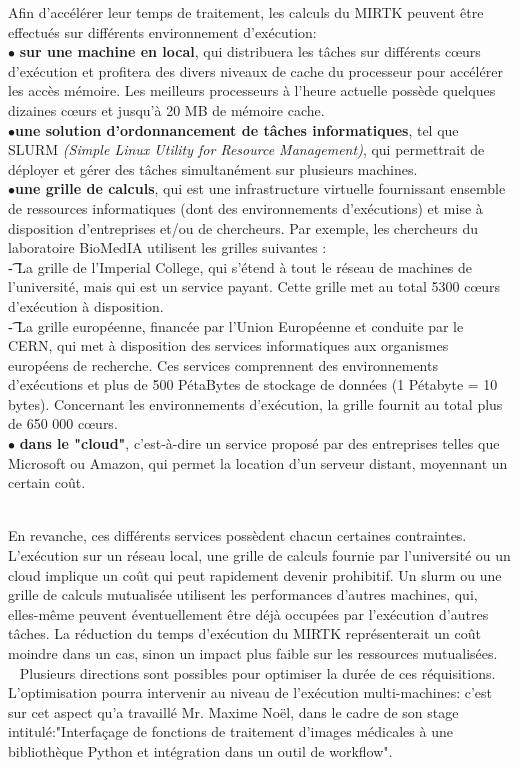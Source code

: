 \documentclass[10pt]{report}
\begin{document}
	Afin d'accélérer leur temps de traitement, les calculs du MIRTK peuvent être effectués sur différents environnement d'exécution:
	\\{$\bullet$}\textbf{ sur une machine en local}, 
	qui distribuera les tâches sur différents cœurs d'exécution et profitera des divers niveaux de cache du processeur pour accélérer les accès mémoire. Les meilleurs processeurs à l'heure actuelle possède quelques dizaines cœurs et jusqu'à 20 MB de mémoire cache.
	\\{$\bullet$}\textbf{une solution d'ordonnancement de tâches informatiques}, tel que SLURM \textit{(Simple Linux Utility for Resource Management)}, qui permettrait de déployer et gérer des tâches simultanément sur plusieurs machines. 
	\\{$\bullet$}\textbf{une grille de calculs}, qui est une infrastructure virtuelle fournissant ensemble de ressources informatiques (dont des environnements d'exécutions) et mise à disposition d'entreprises et/ou de chercheurs. \newline
	Par exemple, les chercheurs du laboratoire BioMedIA utilisent les grilles suivantes : \\
	\t - La grille de l'Imperial College, qui s'étend à tout le réseau de machines de l'université, mais qui est un service payant. Cette grille met au total 5300 cœurs d'exécution à disposition.\\
	\t - La grille européenne, financée par l'Union Européenne et conduite par le CERN, qui met à disposition des services informatiques aux organismes européens de recherche. Ces services comprennent des environnements d'exécutions et plus de 500 PétaBytes de stockage de données (1 Pétabyte = 10 bytes). Concernant les environnements d'exécution, la grille fournit au total plus de 650 000 cœurs.
	\\{$\bullet$}\textbf{ dans le "cloud"}, c'est-à-dire un service proposé par des entreprises telles que Microsoft ou Amazon, qui permet la location d'un serveur distant, moyennant un certain coût. \\ ~\par
	En revanche, ces différents services possèdent chacun certaines contraintes. L'exécution sur un réseau local, une grille de calculs fournie par l'université ou un cloud implique un coût qui peut rapidement devenir prohibitif. Un slurm ou une grille de calculs mutualisée utilisent les performances d'autres machines, qui, elles-même peuvent éventuellement être déjà occupées par l'exécution d'autres tâches. La réduction du temps d'exécution du MIRTK représenterait un coût moindre dans un cas, sinon un impact plus faible sur les ressources mutualisées.\\ 
	Plusieurs directions sont possibles pour optimiser la durée de ces réquisitions. L'optimisation pourra intervenir au niveau de l'exécution multi-machines: c'est sur cet aspect qu'a travaillé Mr. Maxime Noël, dans le cadre de son stage intitulé:"Interfaçage de fonctions de traitement d'images médicales à une bibliothèque Python et intégration dans un outil de workflow".\\
	\vspace{-0.7cm}
\end{document}
